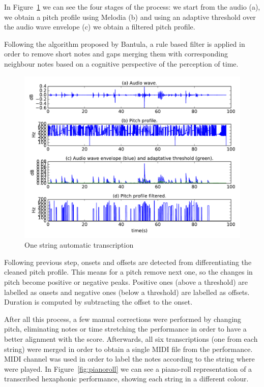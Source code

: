 In Figure~\ref{fig:transcription} we can see the four stages of the process: we start from the audio (a), we obtain a pitch profile using Melodia (b) and using an adaptive threshold over the audio wave envelope (c) we obtain a filtered pitch profile.

Following the algorithm proposed by Bantula, a rule based filter is applied in order to remove short notes and gaps merging them with corresponding neighbour notes based on a cognitive perspective of the perception of time.

\begin{figure}[ht!]
\centering
\includegraphics[width=\textwidth]{Figures/transcription.pdf}
\caption{One string automatic transcription}
\label{fig:transcription}
\end{figure}


Following previous step, onsets and offsets are detected from differentiating the cleaned pitch profile. This means for a pitch remove next one, so the changes in pitch become positive or negative peaks. Positive ones (above a threshold) are labelled as onsets and negative ones (below a threshold) are labelled as offsets. Duration is computed by subtracting the offset to the onset.

After all this process, a few manual corrections were performed by changing pitch, eliminating notes or time stretching the performance in order to have a better alignment with the score. Afterwards, all six transcriptions (one from each string) were merged in order to obtain a single MIDI file from the performance. MIDI channel was used in order to label the notes according to the string where were played. In Figure~\ref{fig:pianoroll} we can see a piano-roll representation of a transcribed hexaphonic performance, showing each string in a different colour.

